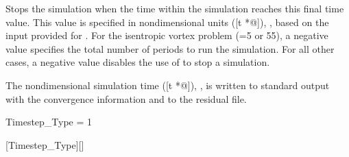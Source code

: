 \begin{nmldescbody}
Stops the simulation when the time within the simulation reaches this
final time value.
%
This value is specified in nondimensional units
([t *@\tstar]), , based on the input
provided for
.
%
For the isentropic vortex problem
(=5 or 55), a
negative value specifies the total number of periods to run the simulation.
%
For all other cases, a negative value disables the use of
 to stop a simulation.

\NOTE
The nondimensional simulation time
([t *@\tstar]), ,
is written to standard output with the convergence information
and to the residual file.
\end{nmldescbody}


\begin{nmldescitem}
Timestep_Type = 1
\end{nmldescitem}
[Timestep\_Type][]


